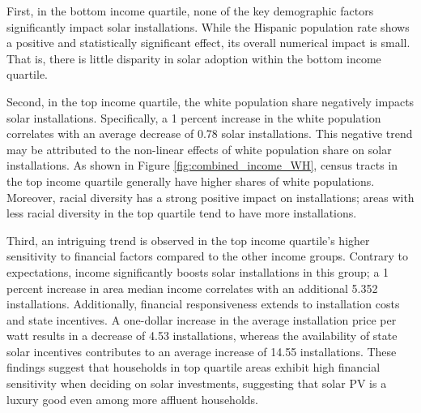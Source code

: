 \documentclass[12pt,twoside,letterpaper]{article}
\begin{document}
First, in the bottom income quartile, none of the key demographic factors significantly impact solar installations. While the Hispanic population rate shows a positive and statistically significant effect, its overall numerical impact is small. That is, there is little disparity in solar adoption within the bottom income quartile. 

Second, in the top income quartile, the white population share negatively impacts solar installations. Specifically, a 1 percent increase in the white population correlates with an average decrease of 0.78 solar installations. This negative trend may be attributed to the non-linear effects of white population share on solar installations. As shown in Figure \ref{fig:combined_income_WH}, census tracts in the top income quartile generally have higher shares of white populations. Moreover, racial diversity has a strong positive impact on installations; areas with less racial diversity in the top quartile tend to have more installations.

Third, an intriguing trend is observed in the top income quartile’s higher sensitivity to financial factors compared to the other income groups. Contrary to expectations, income significantly boosts solar installations in this group; a 1 percent increase in area median income correlates with an additional 5.352 installations. Additionally, financial responsiveness extends to installation costs and state incentives. A one-dollar increase in the average installation price per watt results in a decrease of 4.53 installations, whereas the availability of state solar incentives contributes to an average increase of 14.55 installations. These findings suggest that households in top quartile areas exhibit high financial sensitivity when deciding on solar investments, suggesting that solar PV is a luxury good even among more affluent households.


\end{document}
